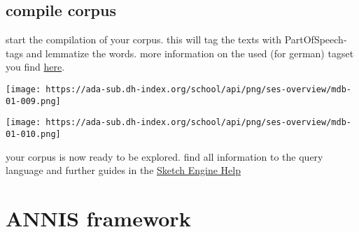 \documentclass[
  12pt,
]{article}
\begin{document}
\hypertarget{compile-corpus}{%
\subsection{compile corpus}\label{compile-corpus}}

start the compilation of your corpus. this will tag the texts with
PartOfSpeech-tags and lemmatize the words. more information on the used
(for german) tagset you find
\href{https://www.sketchengine.eu/German-rftagger-part-of-speech-tagset/}{here}.

\texttt{[image: https://ada-sub.dh-index.org/school/api/png/ses-overview/mdb-01-009.png]}

\texttt{[image: https://ada-sub.dh-index.org/school/api/png/ses-overview/mdb-01-010.png]}

your corpus is now ready to be explored. find all information to the
query language and further guides in the
\href{https://www.sketchengine.eu/German-rftagger-part-of-speech-tagset/}{Sketch
Engine Help}

\hypertarget{annis-framework}{%
\section{ANNIS framework}\label{annis-framework}}
\end{document}
